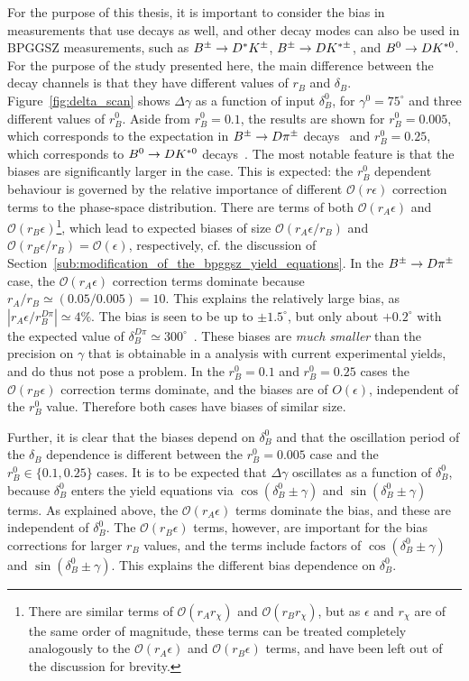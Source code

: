 For the purpose of this thesis, it is important to consider the bias in measurements that use \BtoDpi decays as well, and other \B decay modes can also be used in BPGGSZ measurements, such as ${{B}^\pm}\rightarrow{\ensuremath{{D}^*}}{\ensuremath{{K}^\pm}}$, ${{B}^\pm}\rightarrow{\ensuremath{D}}{\ensuremath{{K}^{*\pm}}}$, and ${{B}^0}\rightarrow{\ensuremath{D}}{\ensuremath{{K}^{*0}}}$. For the purpose of the study presented here, the main difference between the decay channels is that they have different values of $r_B$ and $\delta_B$. Figure~\ref{fig:delta_scan} shows $\Delta\gamma$ as a function of input $\delta_B^0$, for $\gamma^0=75^\circ$ and three different values of $r_B^0$. Aside from $r_B^0=0.1$, the results are shown for $r_B^0=0.005$, which corresponds to the expectation in ${{B}^\pm}\rightarrow{\ensuremath{D}}{\ensuremath{{\pi}^\pm}}$ decays~\cite{rDpi} and $r_B^0=0.25$, which corresponds to ${{B}^0}\rightarrow{\ensuremath{D}}{\ensuremath{{K}^{*0}}}$ decays~\cite{LHCb-CONF-2018-002}. The most notable feature is that the biases are significantly larger in the \BtoDpi case. This is expected: the $r^0_B$ dependent behaviour is governed by the relative importance of different $\mathcal O(r\epsilon)$ correction terms to the phase-space distribution. There are terms of both $\mathcal O(r_A\epsilon)$ and $\mathcal O(r_B\epsilon)$\footnote{There are similar terms of $\mathcal O(r_Ar_\chi)$ and $\mathcal O(r_Br_\chi)$, but as $\epsilon$ and $r_\chi$ are of the same order of magnitude, these terms can be treated completely analogously to the $\mathcal O(r_A\epsilon)$ and $\mathcal O(r_B\epsilon)$ terms, and have been left out of the discussion for brevity.}, which lead to expected biases of size $\mathcal O(r_A\epsilon/r_B)$ and $\mathcal O(r_B\epsilon/r_B)=\mathcal O(\epsilon)$, respectively, cf. the discussion of Section~\ref{sub:modification_of_the_bpggsz_yield_equations}. 
In the ${{B}^\pm}\rightarrow{\ensuremath{D}}{\ensuremath{{\pi}^\pm}}$ case, the $\mathcal O(r_A\epsilon)$ correction terms dominate because $r_A/r_B\simeq (0.05/0.005)=10$. This explains the relatively large bias, as $|r_A\epsilon/r_B^{D\pi}|\simeq 4\%$. The bias is seen to be up to {}$\pm1.5^\circ$, but only about $+0.2^\circ$ with the expected value of $\delta_B^{D\pi}\simeq300^\circ$~\cite{LHCb-PAPER-2016-032,rDpi}. These biases are \emph{much smaller} than the precision on $\gamma$ that is obtainable in a \BtoDpi analysis with current experimental yields, and do thus not pose a problem.
In the $r_B^0=0.1$ and $r_B^0=0.25$ cases the $\mathcal O(r_B\epsilon)$ correction terms dominate, and the biases are of $O(\epsilon)$, independent of the $r_B^0$ value. Therefore both cases have biases of similar size.



Further, it is clear that the biases depend on $\delta_B^0$ and that the oscillation period of the $\delta_B$ dependence is different between the $r^0_B=0.005$ case and the $r_B^0\in\{0.1, 0.25\}$ cases. It is to be expected that $\Delta\gamma$ oscillates as a function of $\delta^0_B$, because $\delta_B^0$ enters the yield equations via $\cos(\delta_B^0\pm\gamma)$ and $\sin(\delta_B^0\pm\gamma)$ terms.  As explained above, the $\mathcal O(r_A\epsilon)$ terms dominate the \BtoDpi bias, and these are independent of $\delta_B^0$. The $\mathcal O(r_B\epsilon)$ terms, however, are important for the bias corrections for larger $r_B$ values, and the terms include factors of $\cos(\delta_B^0\pm\gamma)$ and $\sin(\delta_B^0\pm\gamma)$. This explains the different bias dependence on $\delta^0_B$. 


